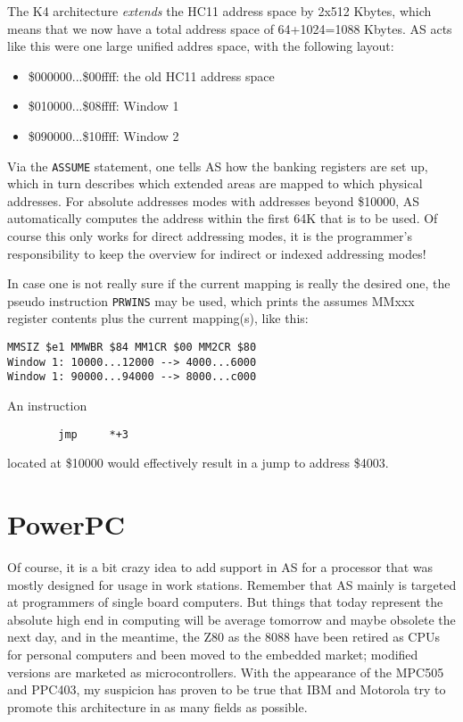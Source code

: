 \documentclass[12pt,twoside]{report}
\begin{document}
The K4 architecture {\em extends} the HC11 address space by 2x512 Kbytes,
which means that we now have a total address space of 64+1024=1088 Kbytes.
AS acts like this were one large unified addres space, with the following
layout:
\begin{itemize}
\item{\$000000...\$00ffff: the old HC11 address space}
\item{\$010000...\$08ffff: Window 1}
\item{\$090000...\$10ffff: Window 2}
\end{itemize}
Via the {\tt ASSUME} statement, one tells AS how the banking registers are
set up, which in turn describes which extended areas are mapped to which
physical addresses.  For absolute addresses modes with addresses beyond
\$10000, AS automatically computes the address within the first 64K that
is to be used.  Of course this only works for direct addressing modes, it
is the programmer's responsibility to keep the overview for indirect or
indexed addressing modes!

In case one is not really sure if the current mapping is really the
desired one, the pseudo instruction {\tt PRWINS} may be used, which prints
the assumes MMxxx register contents plus the current mapping(s), like
this:
\begin{verbatim}
MMSIZ $e1 MMWBR $84 MM1CR $00 MM2CR $80
Window 1: 10000...12000 --> 4000...6000
Window 1: 90000...94000 --> 8000...c000
\end{verbatim}
An instruction
\begin{verbatim}
        jmp     *+3
\end{verbatim}
located at \$10000 would effectively result in a jump to address \$4003.


\section{PowerPC}

Of course, it is a bit crazy idea to add support in AS for a
processor that was mostly designed for usage in work stations.
Remember that AS mainly is targeted at programmers of single board
computers.  But things that today represent the absolute high end in
computing will be average tomorrow and maybe obsolete the next day,
and in the meantime, the Z80 as the 8088 have been retired as CPUs
for personal computers and been moved to the embedded market;
modified versions are marketed as microcontrollers.  With the
appearance of the MPC505 and PPC403, my suspicion has proven to be
true that IBM and Motorola try to promote this architecture in as
many fields as possible.
\end{document}
